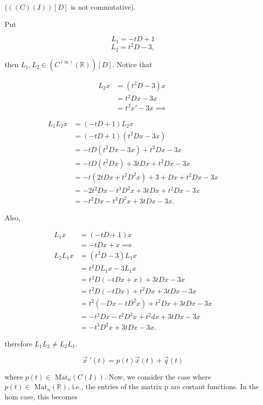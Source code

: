 \begin{example}
(\( ((C)(I))[D] \) is not commutative). 

Put

\[ L_1 = -tD+1 \]
\[ L_2 = t^2D - 3, \]

then \( L_1, L_2 \in ( C^{(\infty)}( \mathbb{R}) ) [D] \). Notice that 

\begin{align*}
  L_2x &= (t^2D-3)x \\
  &= t^2Dx-3x \\
  &= t^2x' -3x \implies
\end{align*}

\begin{align*}
  L_1L_2x &= (-tD + 1)L_2x \\
  &= (-tD + 1)(t^2Dx-3x) \\
  &= -tD(t^2Dx-3x) + t^2Dx-3x \\
  &= -tD(t^2Dx) + 3tDx + t^2Dx-3x \\
  &= -t(2tDx + t^2D^2x) + 3+ Dx + t^2Dx-3x \\
  &= -2t^2Dx - t^3D^2x + 3tDx + t^2Dx - 3x \\
  &= -t^2Dx - t^3D^2x + 3tDx - 3x. 
\end{align*}

Also, 

\begin{align*}
  L_1x &= (-tD+1)x \\
  &= -tDx + x \implies \\
  L_2L_1x &= (t^2D-3)L_1x \\
  &= t^2DL_1x - 3L_1x \\
  &= t^2D(-tDx+x) + 3tDx - 3x \\
  &= t^2D(-tDx) + t^2Dx + 3tDx-3x \\
  &= t^2( -Dx- tD^2x) + t^2Dx+3tDx - 3x \\
  &= -t^2Dx - t^2D^2x + t^2dx + 3tDx - 3x \\
  &= -t^3D^2x+ 3tDx-3x. 
\end{align*}

therefore \( L_1L_2 \neq L_2L_1. \)

\end{example}


\[   \vec{x} \;'(t) = p(t) \vec{x}(t) + \vec{q}(t) \]

where \( p(t) \in \text{ Mat}_n (C(I)) \). Now, we consider the case
where \(  p(t) \in \text{ Mat}_n ( \mathbb{R})  \), i.e., the entries of
the matrix p are costant functions. In the hom case, this becomes 

